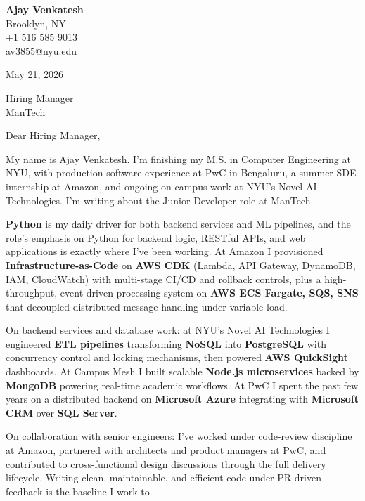 \documentclass[letterpaper,11pt]{article}
\begin{document}
\begin{flushleft}
\textbf{\large Ajay Venkatesh} \\
Brooklyn, NY \\
+1 516 585 9013 \\
\href{mailto:av3855@nyu.edu}{av3855@nyu.edu}
\end{flushleft}
\vspace{10pt}
May 21, 2026
\vspace{6pt}

Hiring Manager \\
ManTech

\vspace{10pt}

Dear Hiring Manager,

My name is Ajay Venkatesh. I'm finishing my M.S. in Computer Engineering at NYU, with production software experience at PwC in Bengaluru, a summer SDE internship at Amazon, and ongoing on-campus work at NYU's Novel AI Technologies. I'm writing about the Junior Developer role at ManTech.

\textbf{Python} is my daily driver for both backend services and ML pipelines, and the role's emphasis on Python for backend logic, RESTful APIs, and web applications is exactly where I've been working. At Amazon I provisioned \textbf{Infrastructure-as-Code} on \textbf{AWS CDK} (Lambda, API Gateway, DynamoDB, IAM, CloudWatch) with multi-stage CI/CD and rollback controls, plus a high-throughput, event-driven processing system on \textbf{AWS ECS Fargate, SQS, SNS} that decoupled distributed message handling under variable load.

On backend services and database work: at NYU's Novel AI Technologies I engineered \textbf{ETL pipelines} transforming \textbf{NoSQL} into \textbf{PostgreSQL} with concurrency control and locking mechanisms, then powered \textbf{AWS QuickSight} dashboards. At Campus Mesh I built scalable \textbf{Node.js microservices} backed by \textbf{MongoDB} powering real-time academic workflows. At PwC I spent the past few years on a distributed backend on \textbf{Microsoft Azure} integrating with \textbf{Microsoft CRM} over \textbf{SQL Server}.

On collaboration with senior engineers: I've worked under code-review discipline at Amazon, partnered with architects and product managers at PwC, and contributed to cross-functional design discussions through the full delivery lifecycle. Writing clean, maintainable, and efficient code under PR-driven feedback is the baseline I work to.
\end{document}
